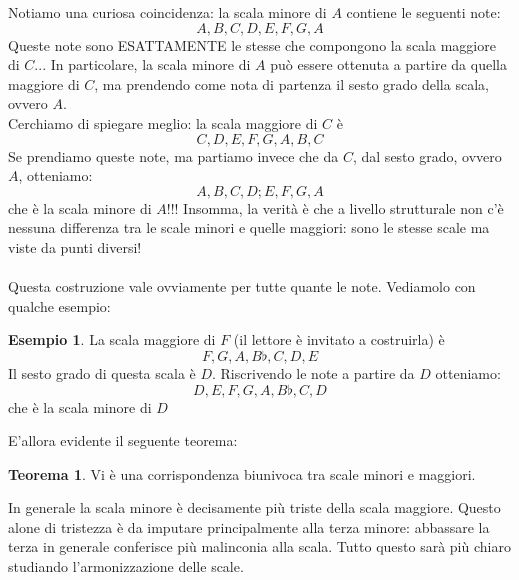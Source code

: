 \documentclass[12pt,a4paper]{book}
\theoremstyle{definition}
\theoremstyle{Theorem}
\newtheorem{Theo}[Def]{Teorema}
\theoremstyle{definition}
\newtheorem{Ex}[Def]{Esempio}
\theoremstyle{definition}
\theoremstyle{definition}
\begin{document}
	 		 Notiamo una curiosa coincidenza: la scala minore di $A$ contiene le seguenti note: 
	 		 $$A,B,C,D,E,F,G,A$$
	 		 Queste note sono ESATTAMENTE le stesse che compongono la scala maggiore di $C$... In particolare, la scala minore di $A$ può essere ottenuta a partire da quella maggiore di $C$, ma prendendo come nota di partenza il sesto grado della scala, ovvero $A$.\\
	 		 Cerchiamo di spiegare meglio: la scala maggiore di $C$ è
	 		$$C,D,E,F,G,A,B,C$$
	 		Se prendiamo queste note, ma partiamo invece che da $C$, dal sesto grado, ovvero $A$, otteniamo:
	 		$$A,B,C,D;E,F,G,A$$ che è la scala minore di $A$!!!
	 		Insomma, la verità è che a livello strutturale non c'è nessuna differenza tra le scale minori e quelle maggiori: sono le stesse scale ma viste da punti diversi!\\
	 		\\
	 		Questa costruzione vale ovviamente per tutte quante le note. Vediamolo con qualche esempio:
	 		\begin{Ex}
	 			La scala maggiore di $F$ (il lettore è invitato a costruirla) è
	 			$$F,G,A,B\flat,C,D,E$$
	 			Il sesto grado di questa scala è $D$. Riscrivendo le note a partire da $D$ otteniamo:
	 			$$D,E,F,G,A,B\flat,C,D$$
	 			che è la scala minore di $D$
	 		\end{Ex}
	 		E'allora evidente il seguente teorema:
	 		\begin{Theo}
	 			Vi è una corrispondenza biunivoca tra scale minori e maggiori.
	 		\end{Theo}
	 		In generale la scala minore è decisamente più triste della scala maggiore. Questo alone di tristezza è da imputare principalmente alla terza minore: abbassare la terza in generale conferisce più malinconia alla scala. Tutto questo sarà più chiaro studiando l'armonizzazione delle scale.
\end{document}
